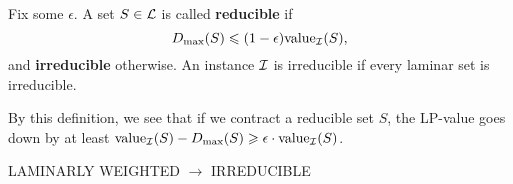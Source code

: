 \documentclass[./main.tex]{subfiles}
\begin{document}
	\begin{definition}
		Fix some $\epsilon$. A set $S\in \mathcal{L}$ is called \textbf{reducible} if
		\[
			D_{\max}(S) \leqslant (1 - \epsilon) \textup{value}_{\mathcal{I}}(S),
		\] 
		and \textbf{irreducible} otherwise. 
		An instance $\mathcal{I}$ is irreducible if every laminar set is irreducible.
	\end{definition}
	
	By this definition, we see that if we contract a reducible set $S$, the LP-value goes down by at least $\textup{value}_{\mathcal{I}}(S) - D_{\max}(S) \geqslant \epsilon\cdot \textup{value}_{\mathcal{I}}(S)$.\\
	
	\begin{algorithm}[h]\label{alg:1}
		\caption{LAMINARLY WEIGHTED $\rightarrow$ IRREDUCIBLE}
	\end{algorithm}
	
\end{document}
